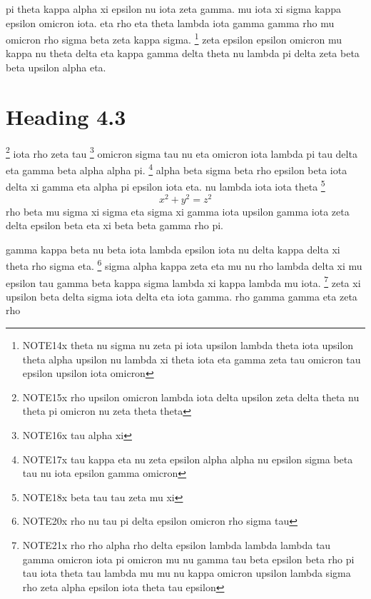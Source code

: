 pi theta kappa alpha xi epsilon nu iota zeta gamma.
mu iota xi sigma kappa epsilon omicron iota.
\label{c-13}
eta rho eta theta lambda iota gamma gamma rho mu omicron rho sigma beta zeta kappa sigma.
\label{c-14}\footnote{\label{n-14}NOTE14x theta nu sigma nu zeta pi iota upsilon lambda theta iota upsilon theta alpha upsilon nu lambda xi theta iota eta gamma zeta tau omicron tau epsilon upsilon iota omicron}
zeta epsilon epsilon omicron mu kappa nu theta delta eta kappa gamma delta theta nu lambda pi delta zeta beta beta upsilon alpha eta.
\section{Heading 4.3}
\label{c-15}\footnote{\label{n-15}NOTE15x rho upsilon omicron lambda iota delta upsilon zeta delta theta nu theta pi omicron nu zeta theta theta}
iota rho zeta tau
\label{c-16}\footnote{\label{n-16}NOTE16x tau alpha xi}
omicron sigma tau nu eta omicron iota lambda pi tau delta eta gamma beta alpha alpha pi.
\label{c-17}\footnote{\label{n-17}NOTE17x tau kappa eta nu zeta epsilon alpha alpha nu epsilon sigma beta tau nu iota epsilon gamma omicron}
alpha beta sigma beta rho epsilon beta iota delta xi gamma eta alpha pi epsilon iota eta.
nu lambda iota iota theta
\label{c-18}\footnote{\label{n-18}NOTE18x beta tau tau zeta mu xi}
\[ x^2 + y^2 = z^2 \]
rho beta mu sigma xi sigma eta sigma xi gamma iota upsilon gamma iota zeta delta epsilon beta eta xi beta beta gamma rho pi.
\label{c-d19}

gamma kappa beta nu beta iota lambda epsilon iota nu delta kappa delta xi theta rho sigma eta.
\label{c-20}\footnote{\label{n-20}NOTE20x rho nu tau pi delta epsilon omicron rho sigma tau}
sigma alpha kappa zeta eta mu nu rho lambda delta xi mu epsilon tau gamma beta kappa sigma lambda xi kappa lambda mu iota.
\label{c-21}\footnote{\label{n-21}NOTE21x rho rho alpha rho delta epsilon lambda lambda lambda tau gamma omicron iota pi omicron mu nu gamma tau beta epsilon beta rho pi tau iota theta tau lambda mu mu nu kappa omicron upsilon lambda sigma rho zeta alpha epsilon iota theta tau epsilon}
zeta xi upsilon beta delta sigma iota delta eta iota gamma.
\label{c-22}\footnotemark{} rho gamma gamma eta zeta rho
\label{t-22}
